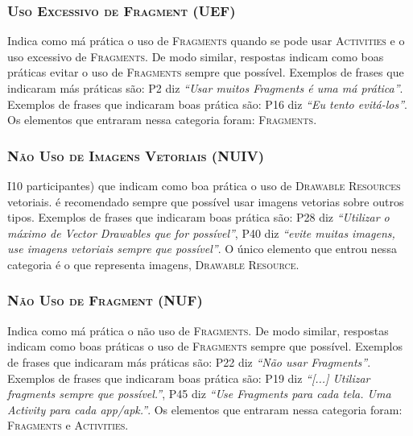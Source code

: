\subsubsection{\textsc{Uso Excessivo de Fragment (UEF)}}
Indica como má prática o uso de \textsc{Fragments} quando se pode usar \textsc{Activities} e o uso excessivo de \textsc{Fragments}. De modo similar, respostas indicam como boas práticas evitar o uso de \textsc{Fragments} sempre que possível. Exemplos de frases que indicaram más práticas são: P2 diz \textit{``Usar muitos Fragments é uma má prática''}. Exemplos de frases que indicaram boas prática são: P16 diz \textit{``Eu tento evitá-los''}. Os elementos que entraram nessa categoria foram: \textsc{Fragments}. 

\subsubsection{\textsc{Não Uso de Imagens Vetoriais (NUIV)}}
I10 participantes) que indicam como boa prática o uso de \textsc{Drawable Resources} vetoriais. é recomendado sempre que possível usar imagens vetorias sobre outros tipos. Exemplos de frases que indicaram boas prática são: P28 diz \textit{``Utilizar o máximo de Vector Drawables que for possível''}, P40 diz \textit{``evite muitas imagens, use imagens vetoriais sempre que possível''}. O único elemento que entrou nessa categoria é o que representa imagens, \textsc{Drawable Resource}.

\subsubsection{\textsc{Não Uso de Fragment (NUF)}}
Indica como má prática o não uso de \textsc{Fragments}. De modo similar, respostas indicam como boas práticas o uso de \textsc{Fragments} sempre que possível. Exemplos de frases que indicaram más práticas são: P22 diz \textit{``Não usar Fragments''}. Exemplos de frases que indicaram boas prática são: P19 diz \textit{``[...] Utilizar fragments sempre que possível.''}, P45 diz \textit{``Use Fragments para cada tela. Uma Activity para cada app/apk.''}. Os elementos que entraram nessa categoria foram: \textsc{Fragments} e \textsc{Activities}. 


